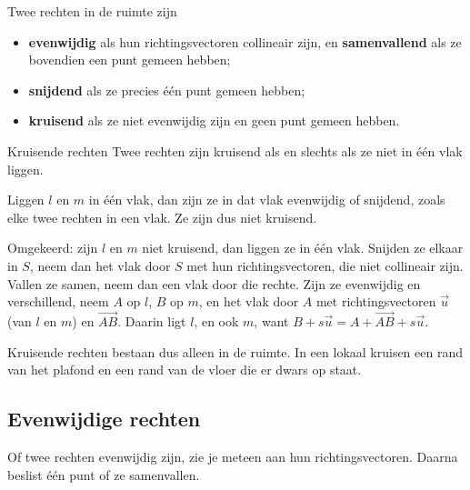 \begin{theorie}
Twee rechten in de ruimte zijn
\begin{itemize}
\item \textbf{\textcolor{accent}{evenwijdig}} als hun richtingsvectoren collineair zijn, en \textbf{\textcolor{accent}{samenvallend}} als ze bovendien een punt gemeen hebben;
\item \textbf{\textcolor{accent}{snijdend}} als ze precies één punt gemeen hebben;
\item \textbf{\textcolor{accent}{kruisend}} als ze niet evenwijdig zijn en geen punt gemeen hebben.
\end{itemize}
\begin{stelling}{Kruisende rechten}
Twee rechten zijn kruisend als en slechts als ze niet in één vlak liggen.
\end{stelling}
\begin{bewijs}
Liggen $l$ en $m$ in één vlak, dan zijn ze in dat vlak evenwijdig of snijdend, zoals elke twee rechten in een vlak. Ze zijn dus niet kruisend.

Omgekeerd: zijn $l$ en $m$ niet kruisend, dan liggen ze in één vlak. Snijden ze elkaar in $S$, neem dan het vlak door $S$ met hun richtingsvectoren, die niet collineair zijn. Vallen ze samen, neem dan een vlak door die rechte. Zijn ze evenwijdig en verschillend, neem $A$ op $l$, $B$ op $m$, en het vlak door $A$ met richtingsvectoren $\vec u$ (van $l$ en $m$) en $\overrightarrow{AB}$. Daarin ligt $l$, en ook $m$, want $B + s\vec u = A + \overrightarrow{AB} + s\vec u$.
\end{bewijs}
\end{theorie}

Kruisende rechten bestaan dus alleen in de ruimte. In een lokaal kruisen een rand van het plafond en een rand van de vloer die er dwars op staat.

\subsection{Evenwijdige rechten}

Of twee rechten evenwijdig zijn, zie je meteen aan hun richtingsvectoren. Daarna beslist één punt of ze samenvallen.


